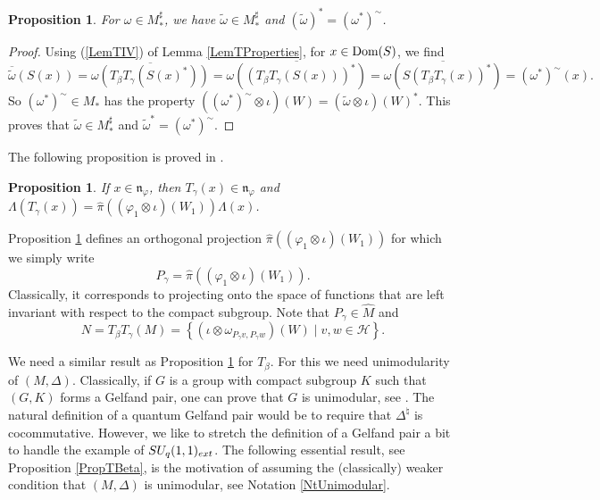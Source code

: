 \documentclass[11pt]{article}
\numberwithin{equation}{section}
\newtheorem{prop}[thm]{Proposition}
\theoremstyle{definition}
\newcommand{\cHil}{\mathcal{H}}
\newcommand{\nphi}{\mathfrak{n}_\varphi}
\newcommand{\Dom}{\text{\rm Dom}}
\begin{document}
\begin{prop}\label{PropSharpTilde}
 For $\omega \in M_\ast^\sharp$, we have $\tilde{\omega} \in M_\ast^\sharp$ and $(\tilde{\omega})^\ast = (\omega^\ast)^{\sim}$.
\end{prop}
\begin{proof}
Using (\ref{LemTIV}) of Lemma \ref{LemTProperties}, for $x \in \Dom(S)$, we f\/ind
\[
 \overline{\tilde{\omega}}(S(x)) = \overline{\omega(T_\beta T_\gamma (S(x)^\ast))} = \overline{\omega((T_\beta T_\gamma (S(x)))^\ast)} = \overline{ \omega(S(T_\beta T_\gamma(x))^\ast)} = (\omega^\ast)^\sim(x).
\]
So $(\omega^\ast)^\sim \in M_\ast$ has the property $((\omega^\ast)^\sim \otimes \iota)(W) = (\tilde{\omega}  \otimes \iota)(W)^\ast$. This proves that $\tilde{\omega} \in M_\ast^\sharp$ and $\tilde{\omega}^\ast = (\omega^\ast)^\sim$.
\end{proof}

The following proposition is proved in \cite[Proposition 3.1]{VaeVaiExt}.

\begin{prop}\label{PropTGamma}
If $x \in \nphi$, then $T_\gamma (x) \in \nphi$ and $\Lambda(T_\gamma(x)) = \hat{\pi}((\varphi_1 \otimes \iota)(W_1)) \Lambda(x)$.
\end{prop}

Proposition \ref{PropTGamma} def\/ines an orthogonal projection $\hat{\pi}((\varphi_1 \otimes \iota)(W_1))$ for which we simply write
\[
P_\gamma = \hat{\pi}((\varphi_1 \otimes \iota)(W_1)).
\]
 Classically, it corresponds to projecting onto the space of functions that are left invariant with respect to the compact subgroup. Note that $P_\gamma \in \hat{M}$ and
\[
N = T_\beta T_\gamma(M) = \left\{ (\iota \otimes \omega_{P_\gamma v, P_\gamma w})(W) \mid v,w \in \cHil \right\}.
\]

We need a similar result as Proposition \ref{PropTGamma} for $T_\beta$. For this we need unimodularity of $(M, \Delta)$. Classically, if $G$ is a group with compact subgroup $K$ such that $(G, K)$ forms a Gelfand pair, one can prove that $G$ is unimodular, see \cite[Proposition~I.1]{Far}. The natural def\/inition of a quantum Gelfand pair would be to require that $\Delta^\natural$ is cocommutative. However, we like to stretch the def\/inition of a Gelfand pair a bit to handle the example of $SU_q(1,1)_{{\rm ext}}$. The following essential result, see Proposition \ref{PropTBeta}, is the motivation of assuming the (classically) weaker condition that $(M, \Delta)$ is unimodular, see Notation \ref{NtUnimodular}.
\end{document}
